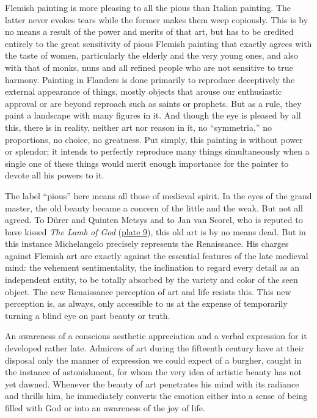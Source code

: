 Flemish painting is more pleasing to all the pious than Italian
painting. The latter never evokes tears while the former makes them weep
copiously. This is by no means a result of the power and merits of that
art, but has to be credited entirely to the great sensitivity of pious
Flemish painting that exactly agrees with the taste of women,
particularly the elderly and the very young ones, and also with that of
monks, nuns and all refined people who are not sensitive to true
harmony. Painting in Flanders is done primarily to reproduce deceptively
the external appearance of things, mostly objects that arouse our
enthusiastic approval or are beyond reproach such as saints or prophets.
But as a rule, they paint a landscape with many figures in it. And
though the eye is pleased by all this, there is in reality, neither art
nor reason in it, no ``symmetria,'' no proportions, no choice, no
greatness. Put simply, this painting is without power or splendor; it
intends to perfectly reproduce many things simultaneously when a single
one of these things would merit enough importance for the painter to
devote all his powers to it.

The label ``pious'' here means all those of medieval spirit. In the eyes
of the grand master, the old beauty became a concern of the little and
the weak. But not all agreed. To Dürer and Quinten
\protect\hypertarget{20_ILLUSTRATIONS_FOLLOW_PAGE.xhtmlux5cux23page_321}{}{}Metsys
and to Jan van Scorel, who is reputed to have kissed \emph{The Lamb of
God}
(\protect\hyperlink{20_ILLUSTRATIONS_FOLLOW_PAGE.xhtmlux5cux23id_9}{plate
9}), this old art is by no means dead. But in this instance Michelangelo
precisely represents the Renaissance. His charges against Flemish art
are exactly against the essential features of the late medieval mind:
the vehement sentimentality, the inclination to regard every detail as
an independent entity, to be totally absorbed by the variety and color
of the seen object. The new Renaissance perception of art and life
resists this. This new perception is, as always, only accessible to us
at the expense of temporarily turning a blind eye on past beauty or
truth.

An awareness of a conscious aesthetic appreciation and a verbal
expression for it developed rather late. Admirers of art during the
fifteenth century have at their disposal only the manner of expression
we could expect of a burgher, caught in the instance of astonishment,
for whom the very idea of artistic beauty has not yet dawned. Whenever
the beauty of art penetrates his mind with its radiance and thrills him,
he immediately converts the emotion either into a sense of being filled
with God or into an awareness of the joy of life.


